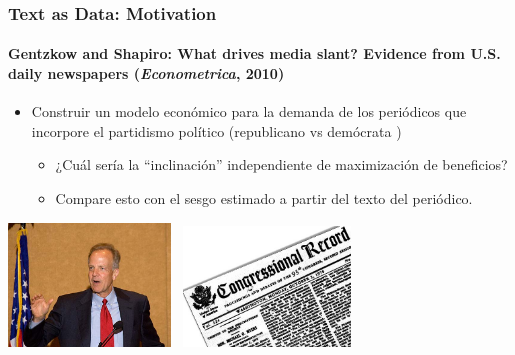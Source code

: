 \documentclass[
  shownotes,
  xcolor={svgnames},
  hyperref={colorlinks,citecolor=DarkBlue,linkcolor=DarkRed,urlcolor=DarkBlue}
  , aspectratio=169]{beamer}
\newcommand{\bk}{\color{black}}
\newcommand{\rd}{\color{red}}
\newcommand{\bl}{\color{blue}}
\begin{document}
\begin{frame}[fragile]
\frametitle{Text as Data: Motivation}
\framesubtitle{Gentzkow and Shapiro: What drives media slant?  Evidence from U.S. daily newspapers ({\it Econometrica}, 2010)}

\begin{itemize}
\item Construir un modelo económico para la demanda de los periódicos que incorpore el partidismo político (\rd republicano \bk vs \bl demócrata \bk)


 
\begin{itemize}
\item ¿Cuál sería la ``inclinación'' independiente de maximización de beneficios?
\item Compare esto con el sesgo estimado a partir del texto del periódico.
\end{itemize}
\end{itemize}

\begin{center}
\includegraphics[width=1.7in]{figures/moran}
~\includegraphics[width=1.75in]{figures/record}
\end{center}


 \end{frame}
\end{document}
